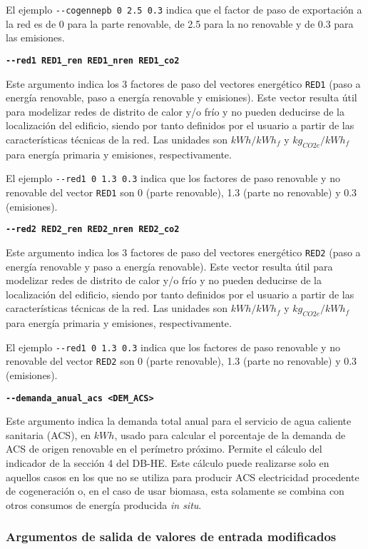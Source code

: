 \documentclass[10pt,notitlepage,oneside,a4paper]{article}
\begin{document}
El ejemplo \texttt{-{}-cogennepb 0 2.5 0.3} indica que el factor de paso de exportación a la red es de 0 para la parte renovable, de 2.5 para la no renovable y de 0.3 para las emisiones.

\textbf{\texttt{-{}-red1 RED1\_ren RED1\_nren RED1\_co2}}

Este argumento indica los 3 factores de paso del vectores energético \texttt{RED1} (paso a energía renovable, paso a energía renovable y emisiones). Este vector resulta útil para modelizar redes de distrito de calor y/o frío y no pueden deducirse de la localización del edificio, siendo por tanto definidos por el usuario a partir de las características técnicas de la red. Las unidades son $kWh/kWh_f$ y $kg_{CO2e}/kWh_f$ para energía primaria y emisiones, respectivamente.

El ejemplo \texttt{-{}-red1 0 1.3 0.3} indica que los factores de paso renovable y no renovable del vector \texttt{RED1} son 0 (parte renovable), 1.3 (parte no renovable) y 0.3 (emisiones).

\textbf{\texttt{-{}-red2 RED2\_ren RED2\_nren RED2\_co2}}

Este argumento indica los 3 factores de paso del vectores energético \texttt{RED2} (paso a energía renovable y paso a energía renovable). Este vector resulta útil para modelizar redes de distrito de calor y/o frío y no pueden deducirse de la localización del edificio, siendo por tanto definidos por el usuario a partir de las características técnicas de la red. Las unidades son $kWh/kWh_f$ y $kg_{CO2e}/kWh_f$ para energía primaria y emisiones, respectivamente.

El ejemplo \texttt{-{}-red1 0 1.3 0.3} indica que los factores de paso renovable y no renovable del vector \texttt{RED2} son 0 (parte renovable), 1.3 (parte no renovable) y 0.3 (emisiones).

\textbf{\texttt{-{}-demanda\_anual\_acs <DEM\_ACS>}}

Este argumento indica la demanda total anual para el servicio de agua caliente sanitaria (ACS), en  $kWh$, usado para calcular el porcentaje de la demanda de ACS de origen renovable en el perímetro próximo. Permite el cálculo del indicador de la sección 4 del DB-HE. Este cálculo puede realizarse solo en aquellos casos en los que no se utiliza para producir ACS electricidad procedente de cogeneración o, en el caso de usar biomasa, esta solamente se combina con otros consumos de energía producida \textit{in situ}.

\subsubsection{Argumentos de salida de valores de entrada modificados}
\end{document}
